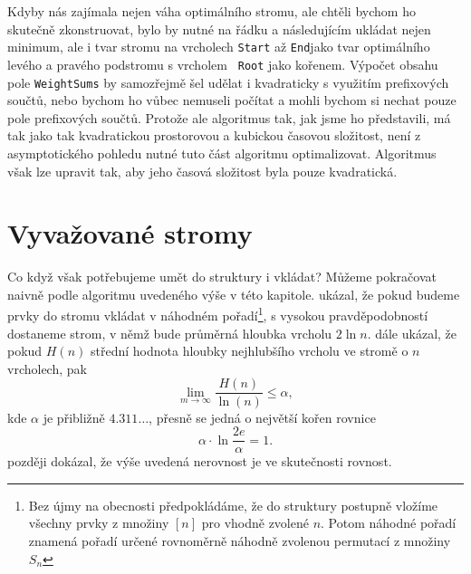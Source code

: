 
Kdyby nás zajímala nejen váha optimálního stromu, ale chtěli bychom ho skutečně
zkonstruovat, bylo by nutné na řádku  a
následujícím ukládat nejen minimum, ale i tvar stromu na vrcholech {\tt Start}
až {\tt End}jako tvar optimálního levého a pravého podstromu s vrcholem {\tt
Root} jako kořenem. Výpočet obsahu pole {\tt WeightSums} by samozřejmě šel
udělat i kvadraticky s využitím prefixových součtů, nebo bychom ho vůbec
nemuseli počítat a mohli bychom si nechat pouze pole prefixových součtů.
Protože ale algoritmus tak, jak jsme ho představili, má tak jako tak kvadratickou prostorovou a kubickou
časovou složitost, není z asymptotického pohledu nutné tuto část algoritmu
optimalizovat. Algoritmus však lze upravit tak, aby jeho časová složitost byla pouze kvadratická.


\section{Vyvažované stromy}

Co když však potřebujeme umět do struktury i vkládat? Můžeme pokračovat naivně
podle algoritmu uvedeného výše v této kapitole. \citet{sortingsearching}
ukázal, že pokud budeme prvky do stromu vkládat v náhodném pořadí\footnote{Bez
újmy na obecnosti předpokládáme, že do struktury postupně vložíme všechny prvky
z množiny $[n]$ pro vhodně zvolené $n$. Potom náhodné pořadí znamená pořadí
určené rovnoměrně náhodně zvolenou permutací z množiny $S_n$}, s vysokou
pravděpodobností dostaneme strom, v němž bude průměrná hloubka vrcholu $2 \ln n$.
\citet{Robson} dále ukázal, že pokud $H(n)$ střední hodnota hloubky nejhlubšího 
vrcholu ve stromě o $n$ vrcholech, pak $$\lim_{m\rightarrow
\infty}\frac{H(n)}{\ln(n)}\leq\alpha,$$ kde $\alpha$ je přibližně
$4.311\dots$, přesně se jedná o největší kořen rovnice $$\alpha\cdot \ln
\frac{2e}{\alpha} = 1.$$ \citet{devroye} později dokázal, že výše uvedená
nerovnost je ve skutečnosti rovnost.

